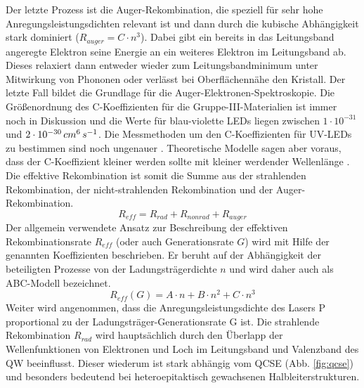 Der letzte Prozess ist die Auger-Rekombination, die speziell für sehr hohe Anregungsleistungsdichten relevant ist und dann durch die kubische Abhängigkeit stark dominiert ($R_{auger} = C \cdot n^3 $). Dabei gibt ein bereits in das Leitungsband angeregte Elektron seine Energie an ein weiteres Elektron im Leitungsband ab. Dieses relaxiert dann entweder wieder zum Leitungsbandminimum unter Mitwirkung von Phononen oder verlässt bei Oberflächennähe den Kristall. Der letzte Fall bildet die Grundlage für die Auger-Elektronen-Spektroskopie.
Die Größenordnung des C-Koeffizienten für die Gruppe-III-Materialien ist immer noch in Diskussion \cite{8b1c5cf85d5a45e0ae9acca7b03dc349} \cite{doi:10.1063/1.2785135} \cite{doi:10.1002/pssc.200880950} und die Werte für blau-violette LEDs liegen zwischen $1 \cdot 10^{-31}$ und $2 \cdot 10^{-30} \thinspace cm^6 \thinspace s^{-1}$. Die Messmethoden um den C-Koeffizienten für UV-LEDs zu bestimmen sind noch ungenauer \cite{1882-0786-8-2-022104}. Theoretische Modelle sagen aber voraus, dass der C-Koeffizient kleiner werden sollte mit kleiner werdender Wellenlänge \cite{doi:10.1063/1.3570656}.
Die effektive Rekombination ist somit die Summe aus der strahlenden Rekombination, der nicht-strahlenden Rekombination und der Auger-Rekombination.
\begin{equation}
    R_{eff} = R_{rad} + R_{nonrad} + R_{auger}
    \label{eq:iqe1}
\end{equation}
Der allgemein verwendete Ansatz zur Beschreibung der effektiven Rekombinationsrate $R_{eff}$ (oder auch Generationsrate $G$) wird mit Hilfe der genannten Koeffizienten beschrieben. Er beruht auf der Abhängigkeit der beteiligten Prozesse von der Ladungsträgerdichte $n$ und wird daher auch als ABC-Modell bezeichnet.
\begin{equation}
    R_{eff} (G) = A \cdot n + B \cdot n^2 + C \cdot n^3 
    \label{eq:iqe2}
\end{equation}
Weiter wird angenommen, dass die Anregungsleistungsdichte des Lasers P proportional zu
der Ladungsträger-Generationsrate G ist. Die strahlende Rekombination $R_{rad}$ wird hauptsächlich durch den Überlapp der Wellenfunktionen von Elektronen und Loch im Leitungsband und Valenzband des QW beeinflusst. Dieser wiederum ist stark abhängig vom QCSE (Abb. 
\ref{fig:qcse}) und besonders bedeutend bei heteroepitaktisch gewachsenen Halbleiterstrukturen. 
%
